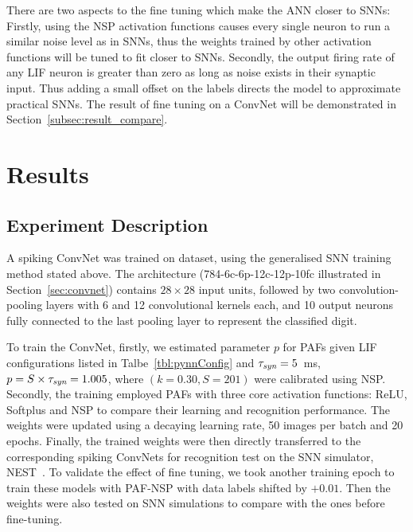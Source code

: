 	
	There are two aspects to the fine tuning which make the ANN closer to SNNs:
	Firstly, using the NSP activation functions causes every single neuron to run \DIFdelbegin {}\DIFdelend \DIFaddbegin {}\DIFaddend a similar noise level as in SNNs, thus the weights trained by other activation functions will be tuned to fit closer to SNNs.
	Secondly, the output firing rate of any LIF neuron is greater than zero as long as noise exists in their synaptic input.
	Thus adding \DIFdelbegin {}\DIFdelend a small offset on the labels directs the model to approximate practical SNNs. 
	The result of fine tuning on a ConvNet will be demonstrated in Section~\ref{subsec:result_compare}.

\section{Results}
\label{sec:iconipResult}
	\subsection{Experiment Description}
	A spiking ConvNet was trained on \DIFdelbegin {}\DIFdelend \DIFaddbegin {}\DIFaddend dataset, 
	using the generalised SNN training method stated above.
	The architecture (784-6c-6p-12c-12p-10fc illustrated in Section~\ref{sec:convnet}) contains $28\times28$ input units, followed by two convolution-pooling layers with 6 and 12 convolutional kernels each, and 10 output neurons fully connected to the last pooling layer to represent the classified digit.

	To train the ConvNet, firstly, we estimated parameter $p$ for PAFs given LIF configurations listed in Talbe~\ref{tbl:pynnConfig} and $\tau_{\textit{\textrm{syn}}}=5$~ms, $p = S \times \tau_{\textit{\textrm{syn}}} = 1.005$, where $(k=0.30, S=201)$ were calibrated using NSP. 
	Secondly, the training employed PAFs with three core activation functions: ReLU, Softplus and NSP to compare their learning and recognition performance.
	The weights were updated using a decaying learning rate, 50 images per batch and 20 epochs.
	Finally, the trained weights were then directly transferred to the corresponding spiking ConvNets for recognition test on the SNN simulator, NEST~\DIFdelbegin {}\DIFdelend \DIFaddbegin {}\DIFaddend .
	To validate the effect of fine tuning, we took another training epoch to train these models with PAF-NSP with data labels shifted by $+0.01$.
	Then the weights were also tested on SNN simulations to compare with the ones before fine-tuning.

